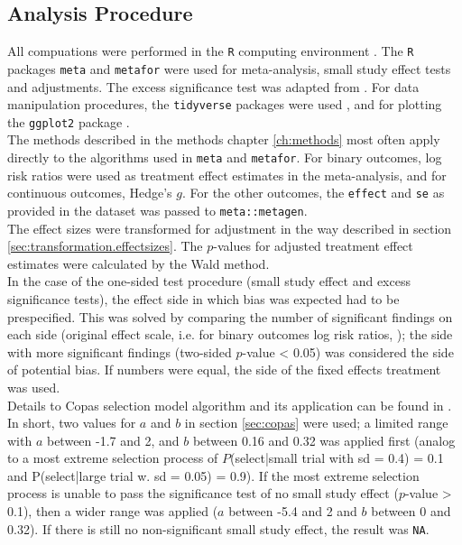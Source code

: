 \documentclass[11pt,a4paper,twoside]{book}\usepackage[]{graphicx}\usepackage[]{color}
\begin{document}
\subsection{Analysis Procedure}
All compuations were performed in the \texttt{R} computing environment \citep{R.base}. The \texttt{R} packages \texttt{meta} \citep{meta.package} and \texttt{metafor} \citep{metafor.package} were used for meta-analysis, small study effect tests and adjustments. The excess significance test was adapted from \citet{vanAert.2019}. For data manipulation procedures, the \texttt{tidyverse} packages were used \citep{tidyverse.package}, and for plotting the \texttt{ggplot2} package \citep{ggplot2}.\\
The methods described in the methods chapter \ref{ch:methods} most often apply directly to the algorithms used in \texttt{meta} and \texttt{metafor}. For binary outcomes, log risk ratios were used as treatment effect estimates in the meta-analysis, and for continuous outcomes, Hedge's $g$. For the other outcomes, the \texttt{effect} and \texttt{se} as provided in the dataset was passed to \texttt{meta::metagen}. \\ 
The effect sizes were transformed for adjustment in the way described in section \ref{sec:transformation.effectsizes}. The $p$-values for adjusted treatment effect estimates were calculated by the Wald method. \\
In the case of the one-sided test procedure (small study effect and excess significance tests), the effect side in which bias was expected had to be prespecified. This was solved by comparing the number of significant findings on each side (original effect scale, i.e. for binary outcomes log risk ratios, \etc); the side with more significant findings (two-sided $p$-value < 0.05) was considered the side of potential bias. If numbers were equal, the side of the fixed effects treatment was used. \\
Details to Copas selection model algorithm and its application can be found in \citet{limitmeta}. In short, two values for $a$ and $b$ in section \ref{sec:copas} were used; a limited range with $a$ between -1.7 and 2, and $b$ between 0.16 and 0.32 was applied first (analog to a most extreme selection process of $P$(select|small trial with sd = 0.4) = 0.1 and P(select|large trial w. sd  = 0.05) = 0.9). If the most extreme selection process is unable to pass the significance test of no small study effect ($p$-value > 0.1), then a wider range was applied ($a$  between -5.4 and 2 and $b$ between 0 and 0.32). If there is still no non-significant small study effect, the result was \texttt{NA}.
\end{document}
